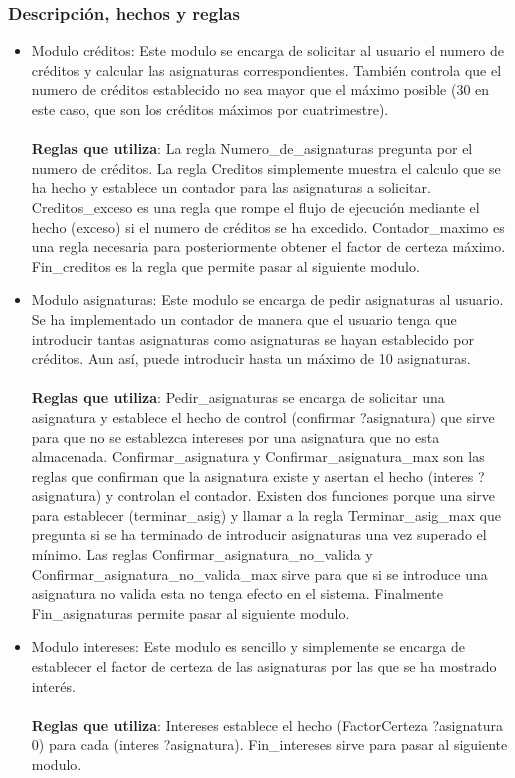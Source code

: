\subsubsection{Descripción, hechos y reglas}
\begin{itemize}
   \item Modulo créditos: Este modulo se encarga de solicitar al usuario el numero de créditos y calcular las asignaturas correspondientes. También controla que el numero de créditos establecido no sea mayor que el máximo posible (30 en este caso, que son los créditos máximos por cuatrimestre).
   \\\\
   \textbf{Reglas que utiliza}: La regla Numero\_de\_asignaturas pregunta por el numero de créditos. La regla Creditos simplemente muestra el calculo que se ha hecho y establece un contador para las asignaturas a solicitar. Creditos\_exceso es una regla que rompe el flujo de ejecución mediante el hecho (exceso) si el numero de créditos se ha excedido. Contador\_maximo es una regla necesaria para posteriormente obtener el factor de certeza máximo. Fin\_creditos es la regla que permite pasar al siguiente modulo.

   \item Modulo asignaturas: Este modulo se encarga de pedir asignaturas al usuario. Se ha implementado un contador de manera que el usuario tenga que introducir tantas asignaturas como asignaturas se hayan establecido por créditos. Aun así, puede introducir hasta un máximo de 10 asignaturas.
   \\\\
   \textbf{Reglas que utiliza}: Pedir\_asignaturas se encarga de solicitar una asignatura y establece el hecho de control (confirmar ?asignatura) que sirve para que no se establezca intereses por una asignatura que no esta almacenada. Confirmar\_asignatura y Confirmar\_asignatura\_max son las reglas que confirman que la asignatura existe y asertan el hecho (interes ?asignatura) y controlan el contador. Existen dos funciones porque una sirve para establecer (terminar\_asig) y llamar a la regla Terminar\_asig\_max que pregunta si se ha terminado de introducir asignaturas una vez superado el mínimo. Las reglas Confirmar\_asignatura\_no\_valida y Confirmar\_asignatura\_no\_valida\_max sirve  para que si se introduce una asignatura no valida esta no tenga efecto en el sistema. Finalmente Fin\_asignaturas permite pasar al siguiente modulo.

   \item Modulo intereses: Este modulo es sencillo y simplemente se encarga de establecer el factor de certeza de las asignaturas por las que se ha mostrado interés.
   \\\\
   \textbf{Reglas que utiliza}: Intereses establece el hecho (FactorCerteza ?asignatura 0) para cada (interes ?asignatura). Fin\_intereses sirve para pasar al siguiente modulo.


\end{itemize}
